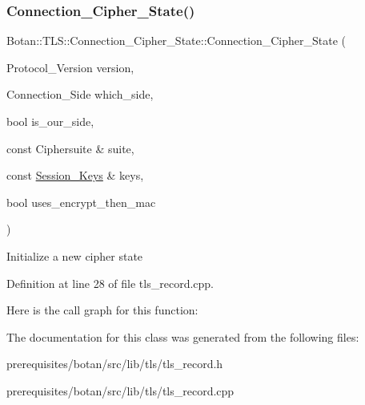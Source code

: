 \subsubsection{\texorpdfstring{Connection\+\_\+\+Cipher\+\_\+\+State()}{Connection\_Cipher\_State()}}
{\footnotesize\ttfamily Botan\+::\+T\+L\+S\+::\+Connection\+\_\+\+Cipher\+\_\+\+State\+::\+Connection\+\_\+\+Cipher\+\_\+\+State (\begin{DoxyParamCaption}\item[{Protocol\+\_\+\+Version}]{version,  }\item[{Connection\+\_\+\+Side}]{which\+\_\+side,  }\item[{bool}]{is\+\_\+our\+\_\+side,  }\item[{const Ciphersuite \&}]{suite,  }\item[{const \mbox{\hyperlink{class_botan_1_1_t_l_s_1_1_session___keys}{Session\+\_\+\+Keys}} \&}]{keys,  }\item[{bool}]{uses\+\_\+encrypt\+\_\+then\+\_\+mac }\end{DoxyParamCaption})}

Initialize a new cipher state 

Definition at line 28 of file tls\+\_\+record.\+cpp.

Here is the call graph for this function\+:


The documentation for this class was generated from the following files\+:\begin{DoxyCompactItemize}
\item 
prerequisites/botan/src/lib/tls/tls\+\_\+record.\+h\item 
prerequisites/botan/src/lib/tls/tls\+\_\+record.\+cpp\end{DoxyCompactItemize}
